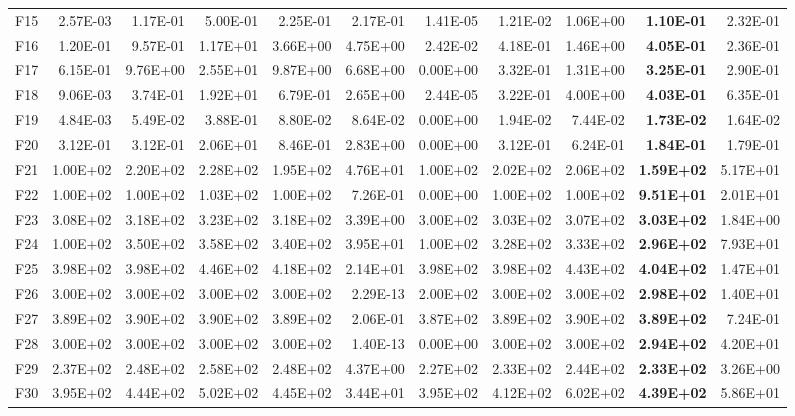 \begin{tabular}{lrrrrrrrrrr}
F15 & 2.57E-03 & 1.17E-01 & 5.00E-01 & 2.25E-01 & 2.17E-01 & 1.41E-05 & 1.21E-02 & 1.06E+00 & \textbf{1.10E-01} & 2.32E-01 \\
F16 & 1.20E-01 & 9.57E-01 & 1.17E+01 & 3.66E+00 & 4.75E+00 & 2.42E-02 & 4.18E-01 & 1.46E+00 & \textbf{4.05E-01} & 2.36E-01 \\
F17 & 6.15E-01 & 9.76E+00 & 2.55E+01 & 9.87E+00 & 6.68E+00 & 0.00E+00 & 3.32E-01 & 1.31E+00 & \textbf{3.25E-01} & 2.90E-01 \\
F18 & 9.06E-03 & 3.74E-01 & 1.92E+01 & 6.79E-01 & 2.65E+00 & 2.44E-05 & 3.22E-01 & 4.00E+00 & \textbf{4.03E-01} & 6.35E-01 \\
F19 & 4.84E-03 & 5.49E-02 & 3.88E-01 & 8.80E-02 & 8.64E-02 & 0.00E+00 & 1.94E-02 & 7.44E-02 & \textbf{1.73E-02} & 1.64E-02 \\
F20 & 3.12E-01 & 3.12E-01 & 2.06E+01 & 8.46E-01 & 2.83E+00 & 0.00E+00 & 3.12E-01 & 6.24E-01 & \textbf{1.84E-01} & 1.79E-01 \\
F21 & 1.00E+02 & 2.20E+02 & 2.28E+02 & 1.95E+02 & 4.76E+01 & 1.00E+02 & 2.02E+02 & 2.06E+02 & \textbf{1.59E+02} & 5.17E+01 \\
F22 & 1.00E+02 & 1.00E+02 & 1.03E+02 & 1.00E+02 & 7.26E-01 & 0.00E+00 & 1.00E+02 & 1.00E+02 & \textbf{9.51E+01} & 2.01E+01 \\
F23 & 3.08E+02 & 3.18E+02 & 3.23E+02 & 3.18E+02 & 3.39E+00 & 3.00E+02 & 3.03E+02 & 3.07E+02 & \textbf{3.03E+02} & 1.84E+00 \\
F24 & 1.00E+02 & 3.50E+02 & 3.58E+02 & 3.40E+02 & 3.95E+01 & 1.00E+02 & 3.28E+02 & 3.33E+02 & \textbf{2.96E+02} & 7.93E+01 \\
F25 & 3.98E+02 & 3.98E+02 & 4.46E+02 & 4.18E+02 & 2.14E+01 & 3.98E+02 & 3.98E+02 & 4.43E+02 & \textbf{4.04E+02} & 1.47E+01 \\
F26 & 3.00E+02 & 3.00E+02 & 3.00E+02 & 3.00E+02 & 2.29E-13 & 2.00E+02 & 3.00E+02 & 3.00E+02 & \textbf{2.98E+02} & 1.40E+01 \\
F27 & 3.89E+02 & 3.90E+02 & 3.90E+02 & 3.89E+02 & 2.06E-01 & 3.87E+02 & 3.89E+02 & 3.90E+02 & \textbf{3.89E+02} & 7.24E-01 \\
F28 & 3.00E+02 & 3.00E+02 & 3.00E+02 & 3.00E+02 & 1.40E-13 & 0.00E+00 & 3.00E+02 & 3.00E+02 & \textbf{2.94E+02} & 4.20E+01 \\
F29 & 2.37E+02 & 2.48E+02 & 2.58E+02 & 2.48E+02 & 4.37E+00 & 2.27E+02 & 2.33E+02 & 2.44E+02 & \textbf{2.33E+02} & 3.26E+00 \\
F30 & 3.95E+02 & 4.44E+02 & 5.02E+02 & 4.45E+02 & 3.44E+01 & 3.95E+02 & 4.12E+02 & 6.02E+02 & \textbf{4.39E+02} & 5.86E+01 \\
\bottomrule
\end{tabular}
